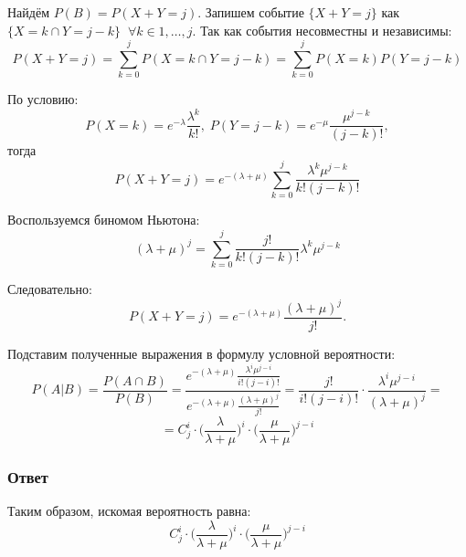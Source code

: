 \documentclass[a4paper,14pt]{extarticle}
\begin{document}
            Найдём \(P(B) = P(X + Y = j) \). Запишем событие \(\{X + Y = j\}\) как \(\{X = k \cap Y = j-k\} \;\; \forall k \in {1, \dots, j}\). Так как события несовместны и независимы:
            \[ P(X + Y = j) = \sum_{k=0}^{j} P(X = k \cap Y = j-k) = \sum_{k=0}^{j}P(X = k) P(Y = j - k)\]
            
            По условию:
            \[P(X = k) = e^{-\lambda} \frac{\lambda^k}{k!}, \; P(Y = j - k) = e^{-\mu} \frac{\mu^{j-k}}{(j-k)!}, \]
            тогда
            \[ P(X + Y = j) = e^{-(\lambda + \mu)} \sum_{k=0}^{j} \frac{\lambda^k \mu^{j-k}}{k!(j-k)!} \]
            
            Воспользуемся биномом Ньютона: \[(\lambda + \mu)^j = \sum_{k=0}^{j} \frac{j!}{k!(j-k)!} \lambda^k \mu^{j-k}\]
            
            Следовательно:
            \[P(X+Y=j) = e^{-(\lambda + \mu)} \frac{(\lambda+\mu)^j}{j!}.\]
            
            Подставим полученные выражения в формулу условной вероятности:
            \[P(A|B) = \frac{P( A \cap B)}{P(B)} = \frac{e^{-(\lambda + \mu)} \frac{\lambda^i \mu^{j-i}}{i!(j-i)!}}{e^{-(\lambda + \mu)} \frac{(\lambda+\mu)^j}{j!}} = \frac{j!}{i!(j-i)!} \cdot \frac{\lambda^i \mu^{j-i}}{(\lambda+\mu)^j} =\]
            \[ = C_j^i \cdot \big(\frac{\lambda}{\lambda+\mu}\big)^i \cdot \big(\frac{\mu}{\lambda+\mu}\big)^{j-i}\]
            
            \subsubsection*{Ответ}
                
                Таким образом, искомая вероятность равна:
                \[
                    \boxed{C_j^i \cdot \big(\frac{\lambda}{\lambda+\mu}\big)^i \cdot \big(\frac{\mu}{\lambda+\mu}\big)^{j-i}}
                \]
\end{document}
